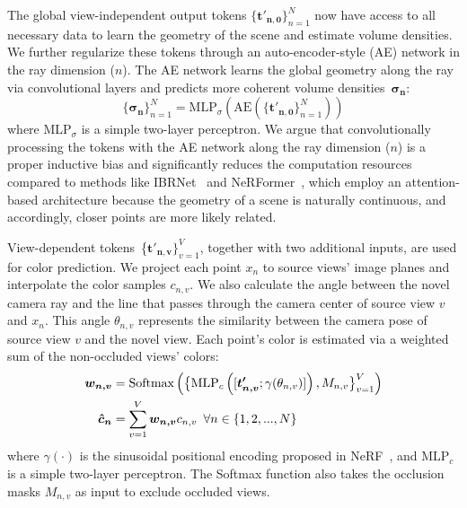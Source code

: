 The global view-independent output tokens $\{\boldsymbol{t'_{n,0}}\}_{n=1}^{N}$ now have access to all necessary data to learn the geometry of the scene and estimate volume densities. We further regularize these tokens through an auto-encoder-style (AE) network in the ray dimension ($n$). The AE network learns the global geometry along the ray via convolutional layers and predicts more coherent volume densities~$\boldsymbol{\sigma_{n}}$:
\begin{equation}
    \{\boldsymbol{\sigma_{n}}\}_{n=1}^{N} = \text{MLP}_{\sigma} \left( \text{AE} \left(\{\boldsymbol{t'_{n,0}}\}_{n=1}^{N} \right) \right)
\end{equation}
where $\text{MLP}_{\sigma}$ is a simple two-layer perceptron. We argue that convolutionally processing the tokens with the AE network along the ray dimension ($n$) is a proper inductive bias and significantly reduces the computation resources compared to methods like IBRNet~\citep{wang2021ibrnet} and NeRFormer~\citep{reizenstein2021common}, which employ an attention-based architecture because the geometry of a scene is naturally continuous, and accordingly, closer points are more likely related.

View-dependent tokens~\{$\boldsymbol{t'_{n,v}}\}_{v=1}^{V}$, together with two additional inputs, are used for color prediction. We project each point $x_{n}$ to source views' image planes and interpolate the color samples $c_{n,v}$. We also calculate the angle between the novel camera ray and the line that passes through the camera center of source view $v$ and $x_{n}$. This angle $\theta_{n,v}$ represents the similarity between the camera pose of source view $v$ and the novel view. Each point's color is estimated via a weighted sum of the non-occluded views' colors:
\begin{align}
\boldsymbol{w_{n,v}} &= \text{Softmax} \left ( \big \{\text{MLP}_c \left ([\boldsymbol{t'_{n,v}}; \gamma(\theta_{n,v})] \right ),M_{n,v} \big \}_{v=1}^{V} \right ) \notag
\\
\boldsymbol{\hat{c}_{n}} &= \sum_{v=1}^{V} \boldsymbol{w_{n,v}}c_{n,v} \phantom{0} \forall n \in \{1, 2, ..., N\}
\end{align}
where $\gamma(\cdot)$ is the sinusoidal positional encoding proposed in NeRF~\citep{mildenhall2020nerf}, and $\text{MLP}_{c}$ is a simple two-layer perceptron. The Softmax function also takes the occlusion masks $M_{n,v}$ as input to exclude occluded views.

